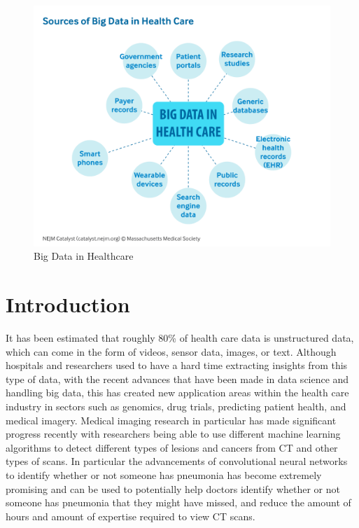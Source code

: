 \documentclass[12pt]{article}
\begin{document}
\newpage
{} %

\begin{figure}

{\centering \includegraphics[width=0.75\linewidth,height=0.25\textheight]{images/big-data-healthcare} 

}

\caption{Big Data in Healthcare}\label{fig:sample-fig}
\end{figure}

\hypertarget{introduction}{%
\section{Introduction}\label{introduction}}

It has been estimated that roughly 80\% of health care data is
unstructured data, which can come in the form of videos, sensor data,
images, or text. Although hospitals and researchers used to have a hard
time extracting insights from this type of data, with the recent
advances that have been made in data science and handling big data, this
has created new application areas within the health care industry in
sectors such as genomics, drug trials, predicting patient health, and
medical imagery. Medical imaging research in particular has made
significant progress recently with researchers being able to use
different machine learning algorithms to detect different types of
lesions and cancers from CT and other types of scans. In particular the
advancements of convolutional neural networks to identify whether or not
someone has pneumonia has become extremely promising and can be used to
potentially help doctors identify whether or not someone has pneumonia
that they might have missed, and reduce the amount of hours and amount
of expertise required to view CT scans.
\end{document}
